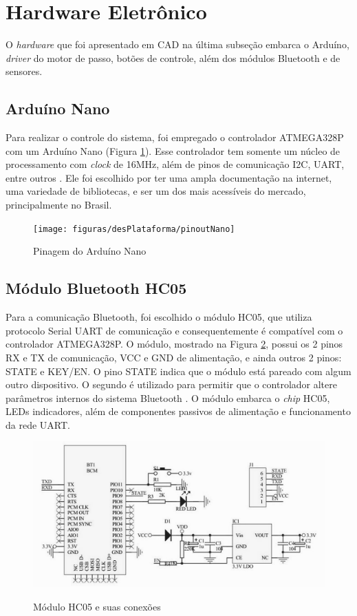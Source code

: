\section{Hardware Eletrônico}

O \textit{hardware} que foi apresentado em CAD na última subseção embarca o Arduíno, \textit{driver} do motor de passo, botões de controle, além dos módulos Bluetooth e de sensores. 

\subsection{Arduíno Nano}
Para realizar o controle do sistema, foi empregado o controlador ATMEGA328P com um Arduíno Nano (Figura \ref{fig:pinoutNano}). Esse controlador tem somente um núcleo de processamento com \textit{clock} de 16MHz, além de pinos de comunicação I2C, UART, entre outros \cite{man:pinoutNano}. Ele foi escolhido por ter uma ampla documentação na internet, uma variedade de bibliotecas, e ser um dos mais acessíveis do mercado, principalmente no Brasil. 

\begin{figure}[htb]
	\centering
	\caption{Pinagem do Arduíno Nano}
	\texttt{[image: figuras/desPlataforma/pinoutNano]}
	\label{fig:pinoutNano}
\end{figure}

\subsection{Módulo Bluetooth HC05}
Para a comunicação Bluetooth, foi escolhido o módulo HC05, que utiliza protocolo Serial UART de comunicação e consequentemente é compatível com o controlador ATMEGA328P. O módulo, mostrado na Figura \ref{fig:hc05}, possui os 2 pinos RX e TX de comunicação, VCC e GND de alimentação, e ainda outros 2 pinos: STATE e KEY/EN. O pino STATE indica que o módulo está pareado com algum outro dispositivo. O segundo é utilizado para permitir que o controlador altere parâmetros internos do sistema Bluetooth \cite{man:hc05}. O módulo embarca o \textit{chip} HC05, LEDs indicadores, além de componentes passivos de alimentação e funcionamento da rede UART.

\begin{figure}[!htb]
	\centering
	\caption{Módulo HC05 e suas conexões}
	\includegraphics[width=\linewidth]{figuras/desPlataforma/HC05}
	\label{fig:hc05}
\end{figure}

